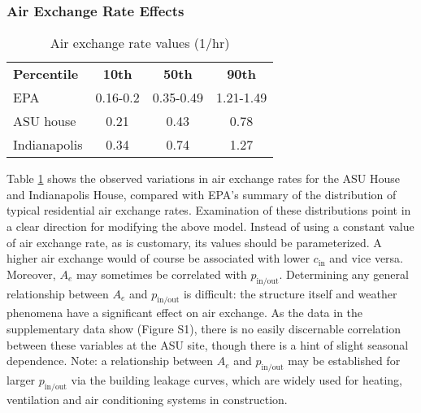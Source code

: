 \documentclass[journal=esthag,manuscript=article]{achemso}
\begin{document}
\subsubsection{Air Exchange Rate Effects}

\begin{table}[htb!]
 \caption{Air exchange rate values (1/hr)}\label{tbl:air_exchange_rate}
 \begin{tabular}{l c c c}
  \toprule
  \textbf{Percentile}                                                     & \textbf{10th} & \textbf{50th} & \textbf{90th} \\
  EPA\cite{u.s._epa_exposure_2011,m._d._koontz_estimation_1995}           & 0.16-0.2      & 0.35-0.49     & 1.21-1.49     \\
  ASU house\cite{holton_temporal_2013,guo_identification_2015}            & 0.21          & 0.43          & 0.78          \\
  Indianapolis\cite{u.s._environmental_protection_agency_assessment_2015} & 0.34          & 0.74          & 1.27          \\
  \bottomrule
 \end{tabular}
\end{table}

Table \ref{tbl:air_exchange_rate} shows the observed variations in air exchange rates for the ASU House and Indianapolis House, compared with EPA’s summary of the distribution of typical residential air exchange rates\cite{u.s._epa_exposure_2011,m._d._koontz_estimation_1995}.
Examination of these distributions point in a clear direction for modifying the above model.
Instead of using a constant value of air exchange rate, as is customary, its values should be parameterized.
A higher air exchange would of course be associated with lower $c_\mathrm{in}$ and vice versa.
Moreover, $A_e$ may sometimes be correlated with $p_\mathrm{in/out}$.
Determining any general relationship between $A_e$ and $p_\mathrm{in/out}$ is difficult: the structure itself and weather phenomena have a significant effect on air exchange.
As the data in the supplementary data show (Figure S1), there is no easily discernable correlation between these variables at the ASU site, though there is a hint of slight seasonal dependence.
Note: a relationship between $A_e$ and $p_\mathrm{in/out}$ may be established for larger $p_\mathrm{in/out}$ via the building leakage curves, which are widely used for heating, ventilation and air conditioning systems in construction.\par
\end{document}
